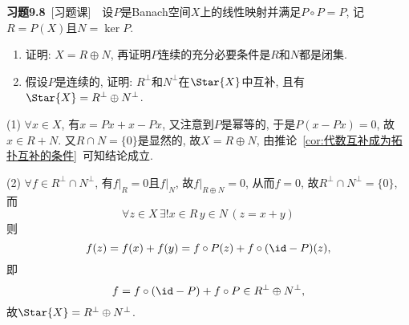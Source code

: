 	\textbf{习题9.8}\ [习题课]\ \ 设$ P $是Banach空间$ X $上的线性映射并满足$ P\circ P=P $, 记$ R=P(X) $且$ N=\ker P $.
	\begin{enumerate}
	\item 证明: $ X=R\oplus N $, 再证明$ P $连续的充分必要条件是$ R $和$ N $都是闭集.
	\item 假设$ P $是连续的, 证明: $ R^\bot $和$ N^\bot $在$ \Star{X} $中互补, 且有$ \Star{X}=R^\bot\oplus N^\bot $.
	\end{enumerate}
	\begin{answer}
	(1) $ \forall x\in X $, 有$ x=Px+x-Px $, 又注意到$ P $是幂等的, 于是$ P(x-Px)=0 $, 故$ x\in R+N $. 又$ R\cap N=\{0\} $是显然的, 故$ X=R\oplus N $, 由推论~\ref{cor:代数互补成为拓扑互补的条件}~可知结论成立.
	
	(2) $ \forall f\in R^\bot\cap N^\bot $, 有$ f|_R=0 $且$ f|_N $, 故$ f|_{R\oplus N}=0 $, 从而$ f=0 $, 故$ R^\bot\cap N^\bot =\{0\} $, 而
	\[
	\forall z\in X\,\exists!x\in R\,y\in N\,(z=x+y)
	\]
	则
	\[
	f(z)=f(x)+f(y)=f\circ P(z)+f\circ(\id-P)(z),
	\]
	即
	\[
	f=f\circ(\id-P)+f\circ P\in R^\bot\oplus N^\bot,
	\]
	故$ \Star{X}=R^\bot\oplus N^\bot $.\qedhere
	\end{answer}

